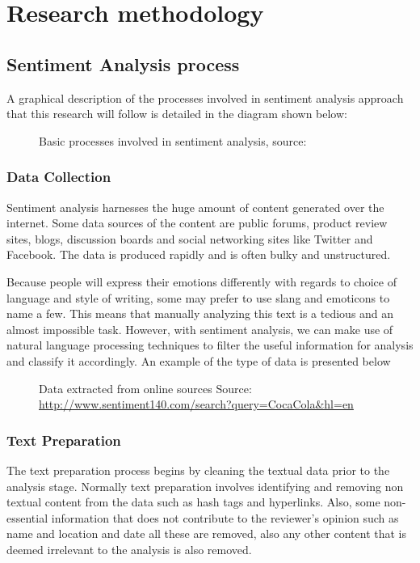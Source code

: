 \chapter{Research methodology}
\section{Sentiment Analysis process}
A graphical description of the processes involved in sentiment analysis approach that this research will follow is detailed in the diagram shown below:

\begin{figure}[h]
  \centering
  \caption[Sentiment analysis process]
  {Basic processes involved in sentiment analysis, source:\cite{ref14}}
  \label{fig:ALAP:sm3}
\end{figure}
\label{research_methodology}


\subsection{Data Collection}
Sentiment analysis harnesses the huge amount of content generated over the internet. Some data sources of the content are public forums, product review sites, blogs, discussion boards and social networking sites like Twitter and Facebook.
The data is produced rapidly and is often bulky and unstructured.

Because people will express their emotions differently with regards to choice of language and style of writing, some may prefer to use slang and emoticons to name a few. This means that manually analyzing this text is a tedious and an almost impossible task.
\clearpage
However, with sentiment analysis, we can make use of natural language processing techniques to filter the useful information for analysis and classify it accordingly. An example of the type of data is presented below



\begin{figure}[h]
  \centering
  \caption[sample tweets]
  {Data extracted from online sources Source: \url{http://www.sentiment140.com/search?query=CocaCola&hl=en}  }
  \label{fig:ALAP:sm1}
\end{figure}



\subsection{Text Preparation}
The text preparation process begins by cleaning the textual data prior to the analysis stage. Normally text preparation involves identifying and removing non textual content from the data such as hash tags and hyperlinks. Also, some non-essential information that does not contribute to the reviewer's opinion such as name and location and date all these are removed, also any other content that is deemed irrelevant to the analysis is also removed.

